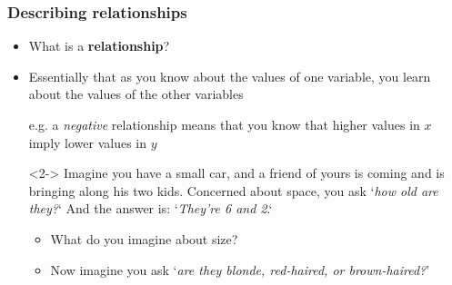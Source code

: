 \documentclass[aspectratio=43]{beamer}
\begin{document}
\begin{frame}
\frametitle{Describing relationships}
\centering

\begin{itemize}
  \item What is a \textbf{relationship}?
  \item Essentially that as you know about the values of one variable, you learn about the values of the other variables
  \item[] e.g. a \textit{negative} relationship means that you know that higher values in $x$ imply lower values in $y$
  \item[]
  \item[]<2-> Imagine you have a small car, and a friend of yours is coming and is bringing along his two kids. Concerned about space, you ask `\textit{how old are they?}` And the answer is: `\textit{They're 6 and 2}.`
  \begin{itemize}
    \item What do you imagine about size?
    \item<3-> Now imagine you ask `\textit{are they blonde, red-haired, or brown-haired?}'
  \end{itemize}
\end{itemize}

\end{frame}



\end{document}
